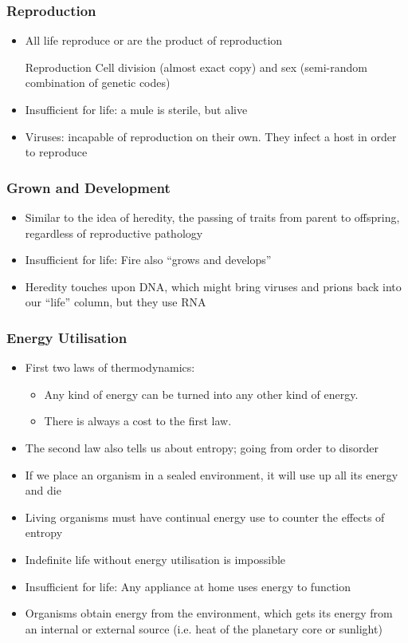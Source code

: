\documentclass[class=article, crop=false]{standalone}
\begin{document}
  \subsubsection{Reproduction}
  \begin{itemize}
    \item All life reproduce or are the product of reproduction
    \begin{definition}{Reproduction}
      Cell division (almost exact copy) and sex (semi-random combination of genetic codes)
    \end{definition}
    \item Insufficient for life: a mule is sterile, but alive
    \item Viruses: incapable of reproduction on their own. They infect a host in order to reproduce
  \end{itemize}
  \subsubsection{Grown and Development}
  \begin{itemize}
    \item Similar to the idea of heredity, the passing of traits from parent to offspring, regardless of reproductive pathology
    \item Insufficient for life: Fire also ``grows and develops''
    \item Heredity touches upon DNA, which might bring viruses and prions back into our ``life'' column, but they use RNA
  \end{itemize}
  \subsubsection{Energy Utilisation}
  \begin{itemize}
    \item First two laws of thermodynamics:
    \begin{itemize}
      \item Any kind of energy can be turned into any other kind of energy.
      \item There is always a cost to the first law.
    \end{itemize}
    \item The second law also tells us about entropy; going from order to disorder
    \item If we place an organism in a sealed environment, it will use up all its energy and die
    \item Living organisms must have continual energy use to counter the effects of entropy
    \item Indefinite life without energy utilisation is impossible
    \item Insufficient for life: Any appliance at home uses energy to function
    \item Organisms obtain energy from the environment, which gets its energy from an internal or external source (i.e. heat of the planetary core or sunlight)
  \end{itemize}
\end{document}
